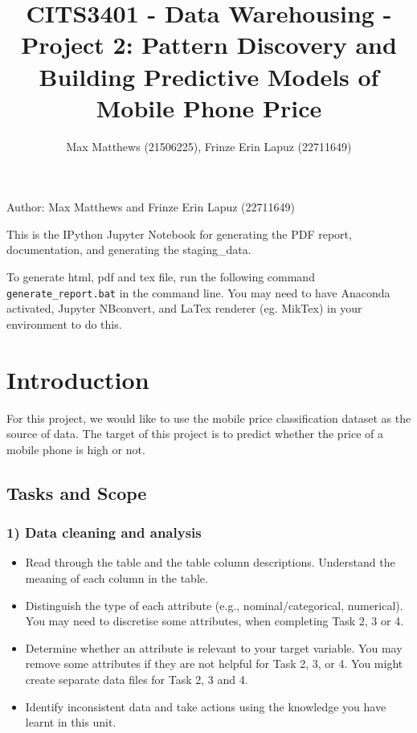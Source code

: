 \documentclass[11pt]{article}
\title{CITS3401 - Data Warehousing - Project 2: Pattern Discovery and Building Predictive Models of Mobile Phone Price}
\author{Max Matthews (21506225), Frinze Erin Lapuz (22711649)}
\providecommand{\tightlist}{%
      \setlength{\itemsep}{0pt}\setlength{\parskip}{0pt}}
\begin{document}
    
    \maketitle
    
    

    
    Author: Max Matthews and Frinze Erin Lapuz (22711649)

This is the IPython Jupyter Notebook for generating the PDF report,
documentation, and generating the staging\_data.

To generate html, pdf and tex file, run the following command
\texttt{generate\_report.bat} in the command line. You may need to have
Anaconda activated, Jupyter NBconvert, and LaTex renderer (eg. MikTex)
in your environment to do this.

    \hypertarget{introduction}{%
\section{Introduction}\label{introduction}}

For this project, we would like to use the mobile price classification
dataset as the source of data. The target of this project is to predict
whether the price of a mobile phone is high or not.

    \hypertarget{tasks-and-scope}{%
\subsection{Tasks and Scope}\label{tasks-and-scope}}

\hypertarget{data-cleaning-and-analysis}{%
\subsubsection{1) Data cleaning and
analysis}\label{data-cleaning-and-analysis}}

\begin{itemize}
\tightlist
\item
  Read through the table and the table column descriptions. Understand
  the meaning of each column in the table.
\item
  Distinguish the type of each attribute (e.g., nominal/categorical,
  numerical). You may need to discretise some attributes, when
  completing Task 2, 3 or 4.
\item
  Determine whether an attribute is relevant to your target variable.
  You may remove some attributes if they are not helpful for Task 2, 3,
  or 4. You might create separate data files for Task 2, 3 and 4.
\item
  Identify inconsistent data and take actions using the knowledge you
  have learnt in this unit.
\end{itemize}
\end{document}

